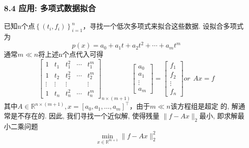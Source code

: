 \documentclass[notheorems,serif]{beamer}
\begin{document}
\begin{frame}
\frametitle{8.4 应用: 多项式数据拟合}
\noindent 已知n个点$\left\{\left(t_{i}, f_{i}\right)\right\}_{i=1}^{n}$，寻找一个低次多项式来拟合这些数据. 设拟合多项式为
$$
p(x)=a_{0}+a_{1} t+a_{2} t^{2}+\cdots+a_{m} t^{m}
$$
通常$m \ll n$将上述n个点代入可得
$$
\left[\begin{array}{ccccc}
{1} & {t_{1}} & {t_{1}^{2}} & {\cdots} & {t_{1}^{m}} \\
{1} & {t_{2}} & {t_{2}^{2}} & {\cdots} & {t_{2}^{m}} \\ {\vdots} & {\vdots} & {\vdots} & {} & {\vdots} \\
{1} & {t_{n}} & {t_{n}^{2}} & {\cdots} & {t_{n}^{m}}\end{array}\right]_{n \times(m+1)}\left[\begin{array}{c}{a_{0}} \\ 
{a_{1}} \\ 
{\vdots} \\ 
{a_{m}}
\end{array}\right]=\left[\begin{array}{c}{f_{1}} \\ {f_{2}} \\ {\vdots} \\ {f_{n}}\end{array}\right] or ~~A x=f
$$
其中$A \in \mathbb{R}^{n \times(m+1)}, x=\left[a_{0}, a_{1}, \ldots, a_{m}\right]^{\top}$，由于$m \ll n$该方程组是超定 的, 解通常是不存在的. 因此, 我们寻找一个近似解, 使得残量
$\|f-A x\|_{2}$最小, 即求解最小二乘问题
$$
\min _{x \in \mathbb{R}^{m+1}}\|f-A x\|_{2}^{2}
$$
\end{frame}
\end{document}
